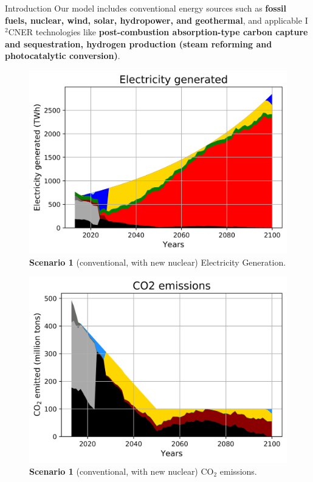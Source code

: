 \documentclass[final]{beamer}
\newlength{\onecolwid}
\newlength{\twocolwid}
\newlength{\threecolwid}
\begin{document}
\begin{frame}[t]
\begin{columns}[t,totalwidth=\threecolwid]
\begin{column}{\twocolwid}
\begin{columns}[t,totalwidth=\twocolwid]
\begin{column}{\onecolwid}
\begin{block}{Introduction}
Our model includes conventional energy sources such as \textbf{fossil fuels, nuclear, wind, solar, hydropower, and geothermal}, and applicable I$^2$CNER technologies like \textbf{post-combustion absorption-type carbon capture and sequestration, hydrogen production (steam reforming and photocatalytic conversion)}. \hfill \break

\end{block}


\begin{figure}[H] 
\centering
\includegraphics[scale=1.2]{conv_nuc_elc}
\caption{\textbf{Scenario 1} (conventional, with new nuclear) Electricity Generation.}
\label{s1e}
\end{figure}

\begin{figure}[H] 
\centering
\includegraphics[scale=1.2]{conv_nuc_co2}
\caption{\textbf{Scenario 1} (conventional, with new nuclear) CO$_2$ emissions.}
\label{s1c}
\end{figure}



\end{column}
\end{columns}
\end{column}
\end{columns}
\end{frame}
\end{document}
